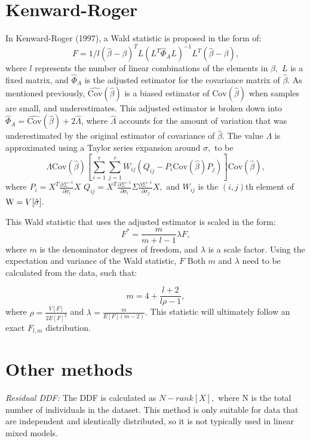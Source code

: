 \documentclass[12pt, twoside]{amherstthesis}
\begin{document}
\hypertarget{kenward-roger}{%
\section{Kenward-Roger}\label{kenward-roger}}

In Kenward-Roger (1997), a Wald statistic is proposed in the form of:
\[F = 1/l(\hat\beta-\beta)^TL(L^T\hat\Phi_A L)^{-1}L^T(\hat\beta-\beta),\] where \(l\) represents the number of linear combinations of the elements in \(\beta,\) \(L\) is a fixed matrix, and \(\hat\Phi_A\) is the adjusted estimator for the covariance matrix of \(\hat\beta\). As mentioned previously, \(\widehat {\text{Cov}}(\hat\beta)\) is a biased estimator of \(\text{Cov}(\hat\beta)\) when samples are small, and underestimates. This adjusted estimator is broken down into \(\hat\Phi_A = \widehat {\text {Cov}}(\hat\beta) + 2\hat\Lambda\), where \(\hat\Lambda\) accounts for the amount of variation that was underestimated by the original estimator of covariance of \(\hat\beta\). The value \(\Lambda\) is approximated using a Taylor series expansion around \(\sigma,\) to be \[\Lambda\text{Cov}(\hat\beta)[\sum_{i=1}^{r}\sum_{j=1}^{r}W_{ij}(Q_{ij}-P_i\text{Cov}(\hat\beta)P_j)]\text{Cov}(\hat\beta),\] where
\(P_i = X^T\frac{\partial\Sigma^{-1}}{\partial\sigma_i}X\)
\(Q_{ij} = X^T \frac{\partial\Sigma^{-1}}{\partial\sigma_i}\Sigma\frac{\partial\Sigma^{-1}}{\partial\sigma_j}X,\) and \(W_{ij}\) is the \((i,j)\)th element of \(\text W = V[\hat\sigma].\)

This Wald statistic that uses the adjusted estimator is scaled in the form: \[F^* = \frac{m}{m+l-1}\lambda F,\] where \(m\) is the denominator degrees of freedom, and \(\lambda\) is a scale factor. Using the expectation and variance of the Wald statistic, \(F\) Both \(m\) and \(\lambda\) need to be calculated from the data, such that:

\[m = 4 + \frac{l+2}{l\rho-1},\] where \(\rho = \frac{V[F]}{2E[F]^2}\) and
\(\lambda = \frac{m}{E[F](m-2)}.\) This statistic will ultimately follow an exact \(F_{l,m}\) distribution.

\hypertarget{other-methods}{%
\section{Other methods}\label{other-methods}}

\emph{Residual DDF:} The DDF is calculated as \(N-rank[X],\) where N is the total number of individuals in the dataset. This method is only suitable for data that are independent and identically distributed, so it is not typically used in linear mixed models.
\end{document}
